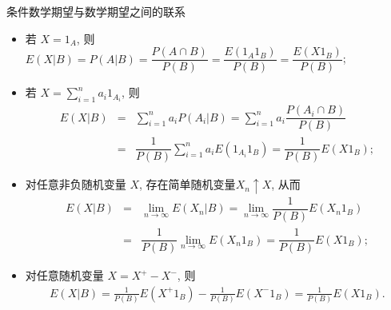 \documentclass[Prob-All.tex]{subfiles}
\begin{document}
\begin{frame}{条件数学期望与数学期望之间的联系}

\small

\begin{itemize}[<+-|alert@+>]
\item 若 $X=1_A$, 则 $E(X|B)=P(A|B)=\dfrac{P(A\cap B)}{P(B)}=\dfrac{E(1_A1_B)}{P(B)}=\dfrac{E(X1_B)}{P(B)}$;
\item 若 $X=\sum_{i=1}^na_i1_{A_i}$, 则
\begin{eqnarray*}
E(X|B)&=&\sum_{i=1}^na_iP(A_i|B)=\sum_{i=1}^na_i\dfrac{P(A_i\cap B)}{P(B)}\\
&=&\dfrac{1}{P(B)}\sum_{i=1}^na_iE(1_{A_i}1_B)=\dfrac{1}{P(B)}E(X1_B);
\end{eqnarray*}
\item 对任意非负随机变量 $X$, 存在简单随机变量$X_n\uparrow X$, 从而%
\begin{eqnarray*}
E(X|B)&=&\lim_{n\to\infty}E(X_n|B)=\lim_{n\to\infty}\dfrac{1}{P(B)}E(X_n1_B)\\
&=&\dfrac{1}{P(B)}\lim_{n\to\infty}E(X_n1_B)=\dfrac{1}{P(B)}E(X1_B);
\end{eqnarray*}
\item 对任意随机变量 $X=X^+-X^-$, 则 %
\begin{eqnarray*}
E(X|B)=\frac{1}{P(B)}E(X^+1_B)-\frac{1}{P(B)}E(X^-1_B)=\frac{1}{P(B)}E(X1_B).
\end{eqnarray*}
\end{itemize}

\end{frame}
\end{document}
